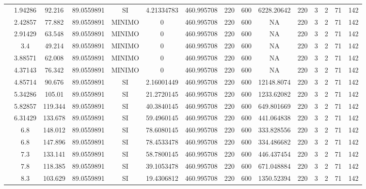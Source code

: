 \begin{table}[H]
{\begin{tabular}{|c|c|c|c|c|c|c|c|c|c|c|c|c|c|c|}
\cline{2-15}    & 1.94286 & 92.216 & 89.0559891 & SI  & 4.21334783 & 460.995708 & 220 & 600 & 6228.20642 & 220 & 3   & 2   & 71  & 142 \bigstrut\\
\cline{2-15}    & 2.42857 & 77.882 & 89.0559891 & MINIMO & 0   & 460.995708 & 220 & 600 & NA  & 220 & 3   & 2   & 71  & 142 \bigstrut\\
\cline{2-15}    & 2.91429 & 63.548 & 89.0559891 & MINIMO & 0   & 460.995708 & 220 & 600 & NA  & 220 & 3   & 2   & 71  & 142 \bigstrut\\
\cline{2-15}    & 3.4 & 49.214 & 89.0559891 & MINIMO & 0   & 460.995708 & 220 & 600 & NA  & 220 & 3   & 2   & 71  & 142 \bigstrut\\
\cline{2-15}    & 3.88571 & 62.008 & 89.0559891 & MINIMO & 0   & 460.995708 & 220 & 600 & NA  & 220 & 3   & 2   & 71  & 142 \bigstrut\\
\cline{2-15}    & 4.37143 & 76.342 & 89.0559891 & MINIMO & 0   & 460.995708 & 220 & 600 & NA  & 220 & 3   & 2   & 71  & 142 \bigstrut\\
\cline{2-15}    & 4.85714 & 90.676 & 89.0559891 & SI  & 2.16001449 & 460.995708 & 220 & 600 & 12148.8074 & 220 & 3   & 2   & 71  & 142 \bigstrut\\
\cline{2-15}    & 5.34286 & 105.01 & 89.0559891 & SI  & 21.2720145 & 460.995708 & 220 & 600 & 1233.62082 & 220 & 3   & 2   & 71  & 142 \bigstrut\\
\cline{2-15}    & 5.82857 & 119.344 & 89.0559891 & SI  & 40.3840145 & 460.995708 & 220 & 600 & 649.801669 & 220 & 3   & 2   & 71  & 142 \bigstrut\\
\cline{2-15}    & 6.31429 & 133.678 & 89.0559891 & SI  & 59.4960145 & 460.995708 & 220 & 600 & 441.064838 & 220 & 3   & 2   & 71  & 142 \bigstrut\\
\cline{2-15}    & 6.8 & 148.012 & 89.0559891 & SI  & 78.6080145 & 460.995708 & 220 & 600 & 333.828556 & 220 & 3   & 2   & 71  & 142 \bigstrut\\
\cline{2-15}    & 6.8 & 147.896 & 89.0559891 & SI  & 78.4533478 & 460.995708 & 220 & 600 & 334.486682 & 220 & 3   & 2   & 71  & 142 \bigstrut\\
\cline{2-15}    & 7.3 & 133.141 & 89.0559891 & SI  & 58.7800145 & 460.995708 & 220 & 600 & 446.437454 & 220 & 3   & 2   & 71  & 142 \bigstrut\\
\cline{2-15}    & 7.8 & 118.385 & 89.0559891 & SI  & 39.1053478 & 460.995708 & 220 & 600 & 671.048884 & 220 & 3   & 2   & 71  & 142 \bigstrut\\
\cline{2-15}    & 8.3 & 103.629 & 89.0559891 & SI  & 19.4306812 & 460.995708 & 220 & 600 & 1350.52394 & 220 & 3   & 2   & 71  & 142 \bigstrut\\

\end{tabular}}
\end{table}

